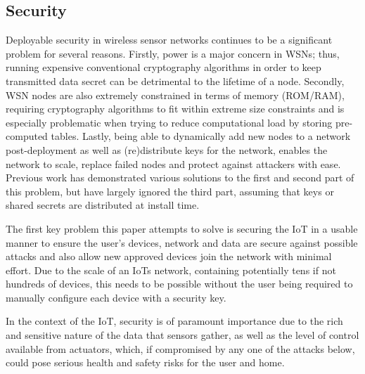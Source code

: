 \documentclass[conference]{./sty/IEEEtran}
\begin{document}
\subsection{Security} %
\label{sub:security}
Deployable security in wireless sensor networks continues to be a significant problem for several reasons. Firstly, power is a major concern in WSNs; thus, running expensive conventional cryptography algorithms in order to keep transmitted data secret can be detrimental to the lifetime of a node. Secondly, WSN nodes are also extremely constrained in terms of memory (ROM/RAM), requiring cryptography algorithms to fit within extreme size constraints and is especially problematic when trying to reduce computational load by storing pre-computed tables. Lastly, being able to dynamically add new nodes to a network post-deployment as well as (re)distribute keys for the network, enables the network to scale, replace failed nodes and protect against attackers with ease. Previous work has demonstrated various solutions to the first and second part of this problem\cite{TinySec,MiniSec,TinyECC}, but have largely ignored the third part, assuming that keys or shared secrets are distributed at install time.

The first key problem this paper attempts to solve is securing the IoT in a usable manner to ensure the user's devices, network and data are secure against possible attacks and also allow new approved devices join the network with minimal effort. Due to the scale of an IoTs network, containing potentially tens if not hundreds of devices, this needs to be possible without the user being required to manually configure each device with a security key.

In the context of the IoT, security is of paramount importance due to the rich and sensitive nature of the data that sensors gather, as well as the level of control available from actuators, which, if compromised by any one of the attacks below, could pose serious health and safety risks for the user and home.
\end{document}
